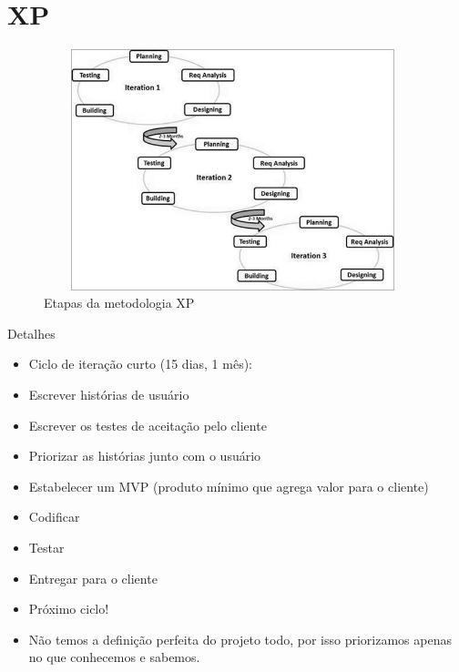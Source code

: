 \section{XP}

\begin{frame}
\begin{block}{}
	 \begin{figure}[!htb]
			\centering	  				
			\includegraphics[height=7cm, width = 11cm]{./pic/sdlc_agile_model.jpg}
			\caption{Etapas da metodologia XP}
			\label{fig_cascata}
		\end{figure}
\end{block}
\end{frame}


\begin{frame}
\begin{block}{Detalhes}
	 \begin{itemize}
			\item Ciclo de iteração curto (15 dias, 1 mês):

			\item Escrever histórias de usuário
			
			\item Escrever os testes de aceitação pelo cliente
			
			\item Priorizar as histórias junto com o usuário
			
			\item Estabelecer um MVP (produto mínimo que agrega valor para o cliente)
			
			\item Codificar
			
			\item Testar
			
			\item Entregar para o cliente
			
			\item Próximo ciclo!
			
			\item Não temos a definição perfeita do projeto todo, por isso priorizamos apenas no que conhecemos e sabemos.

	 \end{itemize}
\end{block}
\end{frame}


